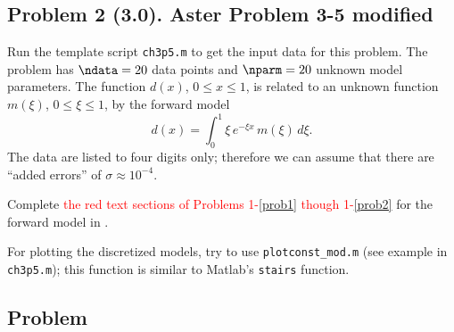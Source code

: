 \documentclass[11pt,titlepage,fleqn]{article}
\newcommand{\numdataA}{20}
\newcommand{\numparmA}{20}
\newcommand{\mv}{\xi}  %
\newcommand{\dv}{x}  %
\begin{document}

\pagebreak
\subsection*{Problem 2 (3.0). Aster Problem 3-5 modified}

Run the template script \verb+ch3p5.m+ to get the input data for this problem.
The problem has $\ndata = \numdataA$ data points and $\nparm = \numparmA$ unknown model parameters.
The function $d(\dv)$, $0 \le \dv \le 1$, is related to an unknown function $m(\mv)$, $0 \le \mv \le 1$, by the forward model
%
\begin{equation}
d(\dv) = \int_0^1 \mv\,e^{-\mv \dv}\,m(\mv)\,d\mv.
\label{dy}
\end{equation}
%
The data are listed to four digits only; therefore we can assume that there are ``added errors'' of $\sigma \approx 10^{-4}$.


\bigskip\noindent
Complete \textcolor{red}{the red text sections of Problems 1-\ref{prob1} though 1-\ref{prob2}} for the forward model in .

\noindent
For plotting the discretized models, try to use \verb+plotconst_mod.m+ (see example in \verb+ch3p5.m+); this function is similar to Matlab's \verb+stairs+ function.


\subsection*{Problem} \howmuchtime\






\end{document}
